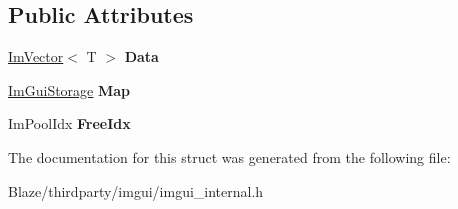 \subsection*{Public Attributes}
\begin{DoxyCompactItemize}
\item 
\mbox{\label{structImPool_a1f525c22aca2e43ae174ad2cc8ccae6d}} 
\hyperlink{structImVector}{Im\+Vector}$<$ T $>$ {\bfseries Data}
\item 
\mbox{\label{structImPool_a6d3b4c9267ef5f496abb97871f9820eb}} 
\hyperlink{structImGuiStorage}{Im\+Gui\+Storage} {\bfseries Map}
\item 
\mbox{\label{structImPool_afe057c62cef34c6425dd56a8a396c118}} 
Im\+Pool\+Idx {\bfseries Free\+Idx}
\end{DoxyCompactItemize}


The documentation for this struct was generated from the following file\+:\begin{DoxyCompactItemize}
\item 
Blaze/thirdparty/imgui/imgui\+\_\+internal.\+h\end{DoxyCompactItemize}
